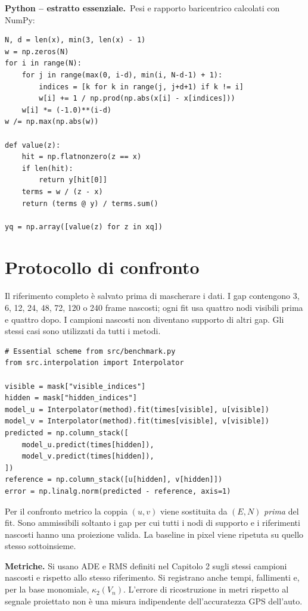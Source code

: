 \documentclass[11pt,a4paper]{article}
\newcommand{\python}{\textbf{Python -- estratto essenziale.}}
\numberwithin{equation}{section}
\begin{document}
\python\ Pesi e rapporto baricentrico calcolati con NumPy:
\begin{lstlisting}
N, d = len(x), min(3, len(x) - 1)
w = np.zeros(N)
for i in range(N):
    for j in range(max(0, i-d), min(i, N-d-1) + 1):
        indices = [k for k in range(j, j+d+1) if k != i]
        w[i] += 1 / np.prod(np.abs(x[i] - x[indices]))
    w[i] *= (-1.0)**(i-d)
w /= np.max(np.abs(w))

def value(z):
    hit = np.flatnonzero(z == x)
    if len(hit):
        return y[hit[0]]
    terms = w / (z - x)
    return (terms @ y) / terms.sum()

yq = np.array([value(z) for z in xq])
\end{lstlisting}

\section{Protocollo di confronto}

Il riferimento completo è salvato prima di mascherare i dati. I gap
contengono 3, 6, 12, 24, 48, 72, 120 o 240 frame nascosti; ogni fit usa quattro nodi visibili
prima e quattro dopo. I campioni nascosti non diventano supporto di altri
gap. Gli stessi casi sono utilizzati da tutti i metodi.

\begin{lstlisting}
# Essential scheme from src/benchmark.py
from src.interpolation import Interpolator

visible = mask["visible_indices"]
hidden = mask["hidden_indices"]
model_u = Interpolator(method).fit(times[visible], u[visible])
model_v = Interpolator(method).fit(times[visible], v[visible])
predicted = np.column_stack([
    model_u.predict(times[hidden]),
    model_v.predict(times[hidden]),
])
reference = np.column_stack([u[hidden], v[hidden]])
error = np.linalg.norm(predicted - reference, axis=1)
\end{lstlisting}

Per il confronto metrico la coppia $(u,v)$ viene sostituita da $(E,N)$
\emph{prima} del fit. Sono ammissibili soltanto i gap per cui tutti i nodi
di supporto e i riferimenti nascosti hanno una proiezione valida.
La baseline in pixel viene ripetuta su quello stesso sottoinsieme.

\textbf{Metriche.} Si usano ADE e RMS definiti nel Capitolo 2 sugli stessi
campioni nascosti e rispetto allo stesso riferimento.
Si registrano anche tempi, fallimenti e, per la base monomiale,
$\kappa_2(V_n)$. L'errore di ricostruzione in metri rispetto al segnale
proiettato non è una misura indipendente dell'accuratezza GPS dell'auto.
\end{document}
